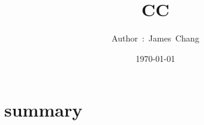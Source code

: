 

\title{CC}
\author{ {\Biohazard} \hspace{1.5mm} \hspace{1.5mm} Author\ :\ James\ Chang}
\date{\today}


\large

\tableofcontents

\chapter{summary}




